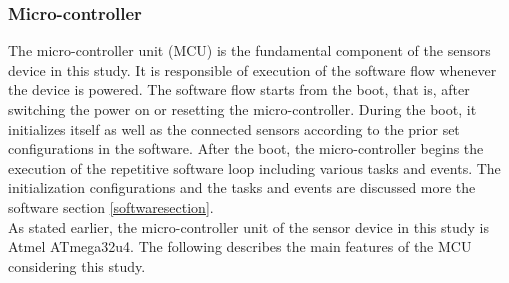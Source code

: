 \documentclass[english,12pt,a4paper,pdftex,elec,utf8]{aaltothesis}
\begin{document}
\subsubsection*{Micro-controller}

The micro-controller unit (MCU) is the fundamental component of the sensors device in this study. It is responsible of execution of the software flow whenever the device is powered. The software flow starts from the boot, that is, after switching the power on or resetting the micro-controller. During the boot, it initializes itself as well as the connected sensors according to the prior set configurations in the software. After the boot, the micro-controller begins the execution of the repetitive software loop including various tasks and events. The initialization configurations and the tasks and events are discussed more the software section \ref{softwaresection}. \\

As stated earlier, the micro-controller unit of the sensor device in this study is Atmel ATmega32u4. The following describes the main features of the MCU considering this study.
\end{document}
